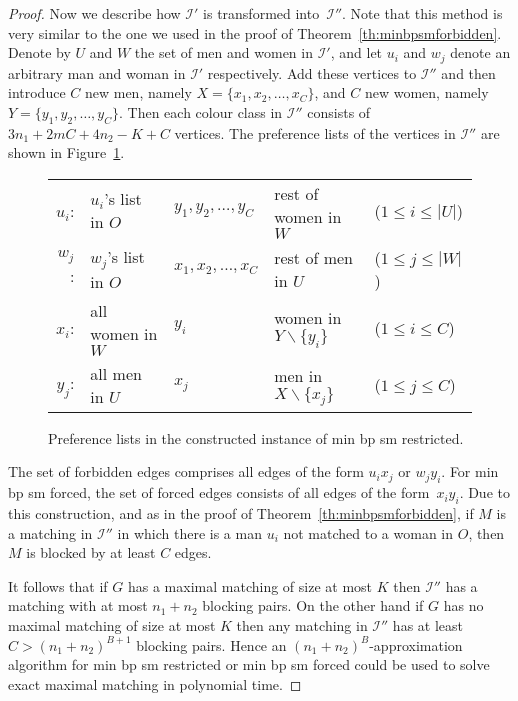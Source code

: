 \documentclass[preprint,12pt]{elsarticle}
\begin{document}
\begin{proof}
Now we describe how $\mathcal{I'}$ is transformed into~$\mathcal{I''}$. Note that this method is very similar to the one we used in the proof of Theorem~\ref{th:minbpsmforbidden}. Denote by $U$ and $W$ the set of men and women in $\mathcal I'$, and let $u_i$ and $w_j$ denote an arbitrary man and woman in $\mathcal I'$ respectively.  Add these vertices to $\mathcal I''$ and then introduce $C$ new men, namely $X=\{x_1,x_2,\dots,x_C\}$, and $C$ new women, namely $Y=\{y_1,y_2,\dots,y_C\}$. Then each colour class in $\mathcal I''$ consists of $3 n_1 + 2mC + 4n_2 -K + C$ vertices. The preference lists of the vertices in $\mathcal I''$ are shown in Figure~\ref{fig:preflists2}.

\begin{figure}[h]
\begin{center}
\begin{tabular}{rllll}
   $u_i$:& $u_i$'s list in $O$ & $y_1,y_2,\dots,y_C$ & rest of women in $W$ & ($1\leq i\leq |U|$)\\
   $w_j$:& $w_j$'s list in $O$ & $x_1,x_2,\dots,x_C$ & rest of men in $U$ & ($1\leq j\leq |W|$) \\
   $x_i$:& all women in $W$ & $y_i$ & women in $Y\backslash \{y_i\}$ & ($1\leq i\leq C$) \\
   $y_j$:& all men in $U$ & $x_j$ & men in $X\backslash \{x_j\}$ & ($1\leq j\leq C$)
\end{tabular}
\end{center}
\caption{Preference lists in the constructed instance of {\sc min bp sm restricted}.}
\label{fig:preflists2}
\end{figure}

The set of forbidden edges comprises all edges of the form $u_ix_j$ or $w_jy_i$. For {\sc min bp sm forced}, the set of forced edges consists of all edges of the form~$x_i y_i$. Due to this construction, and as in the proof of Theorem~\ref{th:minbpsmforbidden}, if $M$ is a matching in $\mathcal{I''}$ in which there is a man $u_i$ not matched to a woman in $O$, then $M$ is blocked by at least $C$ edges. 

It follows that if $G$ has a maximal matching of size at most $K$ then $\mathcal I''$ has a matching with at most $n_1+n_2$ blocking pairs.  On the other hand if $G$ has no maximal matching of size at most $K$ then any matching in $\mathcal I''$ has at least $C>(n_1+n_2)^{B+1}$ blocking pairs.  Hence an $(n_1+n_2)^B$-approximation algorithm for {\sc min bp sm restricted} or {\sc min bp sm forced} could be used to solve {\sc exact maximal matching} in polynomial time.


\end{proof}
\end{document}
